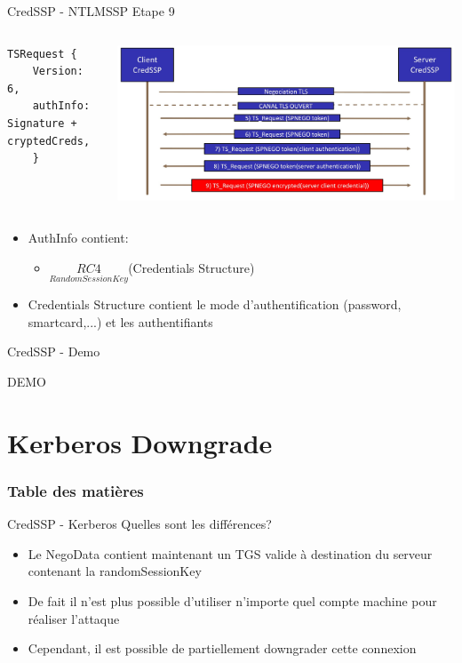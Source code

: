 \documentclass{beamer}
\begin{document}
\begin{frame}[fragile]{CredSSP - NTLMSSP Etape 9 }
	 \begin{columns}[T]
	 	 \begin{lstlisting}[frame=single,basicstyle=\tiny]
TSRequest {
	Version:     6,
	authInfo: Signature + cryptedCreds,
	}
	\end{lstlisting}
	\includegraphics[scale=0.055]{step9.jpg}
	\end{columns}
		\begin{itemize}
		\item AuthInfo contient:
			\begin{itemize}
			\item $\underset{RandomSessionKey}{RC4}$(Credentials Structure)
			\end{itemize}
		\item Credentials Structure contient le mode d'authentification (password, smartcard,...) et les authentifiants
		\end{itemize}
\end{frame}

\begin{frame}[fragile]{CredSSP - Demo}
	 \begin{center} DEMO
	 \end{center}
\end{frame}

\section{Kerberos Downgrade}

\begin{frame}
	\frametitle{Table des matières}
	\tableofcontents[currentsection]
\end{frame}
\begin{frame}[fragile]{CredSSP - Kerberos}
Quelles sont les différences?
\begin{itemize}
\item Le NegoData contient maintenant un TGS valide à destination du serveur contenant la randomSessionKey
\item De fait il n'est plus possible d'utiliser n'importe quel compte machine pour réaliser l'attaque
\item Cependant, il est possible de partiellement downgrader cette connexion
\end{itemize}
\end{frame}
\end{document}

